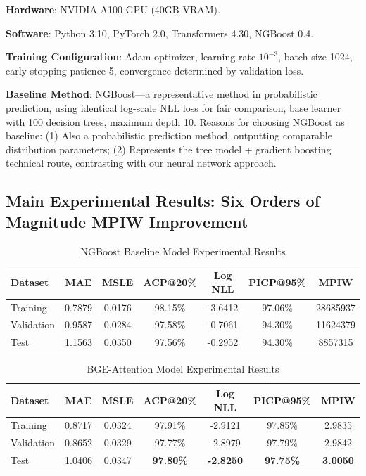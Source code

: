 \documentclass[10pt]{article}
\begin{document}
\textbf{Hardware}: NVIDIA A100 GPU (40GB VRAM).

\textbf{Software}: Python 3.10, PyTorch 2.0, Transformers 4.30, NGBoost 0.4.

\textbf{Training Configuration}: Adam optimizer, learning rate $10^{-3}$, batch size 1024, early stopping patience 5, convergence determined by validation loss.

\textbf{Baseline Method}: NGBoost\cite{duan2020ngboost}---a representative method in probabilistic prediction, using identical log-scale NLL loss for fair comparison, base learner with 100 decision trees, maximum depth 10. Reasons for choosing NGBoost as baseline: (1) Also a probabilistic prediction method, outputting comparable distribution parameters; (2) Represents the tree model + gradient boosting technical route, contrasting with our neural network approach.

\subsection{Main Experimental Results: Six Orders of Magnitude MPIW Improvement}

\begin{table}[H]
\centering
\caption{NGBoost Baseline Model Experimental Results}
\label{tab:ngboost_results}
\begin{tabular}{lcccccc}
\toprule
\textbf{Dataset} & \textbf{MAE} & \textbf{MSLE} & \textbf{ACP@20\%} & \textbf{Log NLL} & \textbf{PICP@95\%} & \textbf{MPIW} \\
\midrule
Training & 0.7879 & 0.0176 & 98.15\% & -3.6412 & 97.06\% & 28685937 \\
Validation & 0.9587 & 0.0284 & 97.58\% & -0.7061 & 94.30\% & 11624379 \\
Test & 1.1563 & 0.0350 & 97.56\% & -0.2952 & 94.30\% & 8857315 \\
\bottomrule
\end{tabular}
\end{table}

\begin{table}[H]
\centering
\caption{BGE-Attention Model Experimental Results}
\label{tab:bge_results}
\begin{tabular}{lcccccc}
\toprule
\textbf{Dataset} & \textbf{MAE} & \textbf{MSLE} & \textbf{ACP@20\%} & \textbf{Log NLL} & \textbf{PICP@95\%} & \textbf{MPIW} \\
\midrule
Training & 0.8717 & 0.0324 & 97.91\% & -2.9121 & 97.85\% & 2.9835 \\
Validation & 0.8652 & 0.0329 & 97.77\% & -2.8979 & 97.79\% & 2.9842 \\
Test & 1.0406 & 0.0347 & \textbf{97.80\%} & \textbf{-2.8250} & \textbf{97.75\%} & \textbf{3.0050} \\
\bottomrule
\end{tabular}
\end{table}
\end{document}
